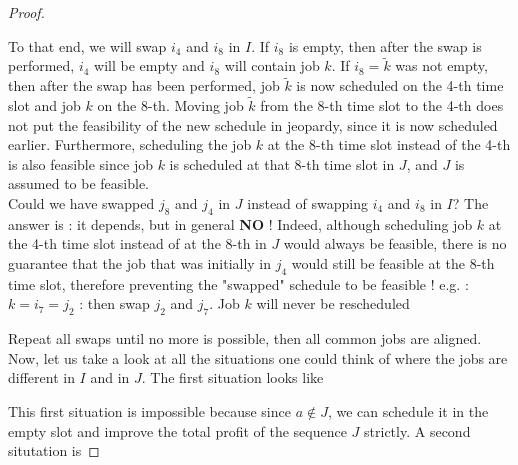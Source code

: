 \begin{proof}
\begin{example}
\begin{leftbar}
To that end, we will swap $i_4$ and $i_8$ in $I$. If $i_8$ is empty, then after the swap is performed, $i_4$ will be empty and $i_8$ will contain job $k$. If $i_8 = \tilde{k}$ was not empty, then after the swap has been performed, job $\tilde{k}$ is now scheduled on the 4-th time slot and job $k$ on the 8-th. Moving job $\tilde{k}$ from the 8-th time slot to the 4-th does not put the feasibility of the new schedule in jeopardy, since it is now scheduled earlier. Furthermore, scheduling the job $k$ at the 8-th time slot instead of the 4-th is also feasible since job $k$ is scheduled at that 8-th time slot in $J$, and $J$ is assumed to be feasible. \\

Could we have swapped $j_8$ and $j_4$ in $J$ instead of swapping $i_4$ and $i_8$ in $I$? The answer is : it depends, but in general \textbf{NO} ! Indeed, although scheduling job $k$ at the 4-th time slot instead of at the 8-th in $J$ would always be feasible, there is no guarantee that the job that was initially in $j_4$ would still be feasible at the 8-th time slot, therefore preventing the "swapped" schedule to be feasible !
e.g. : $k = i_7 = j_2$ : then swap $j_2$ and $j_7$. Job $k$ will never be rescheduled
\end{leftbar}
\end{example}

Repeat all swaps until no more is possible, then all common jobs are aligned.
Now, let us take a look at all the situations one could think of where the jobs are different in $I$ and in $J$. The first situation looks like

\begin{figure}[h!]
\centering


\end{figure}

This first situation is impossible because since $a \notin J$, we can schedule it in the empty slot and improve the total profit of the sequence $J$ strictly. A second situtation is


\end{proof}
